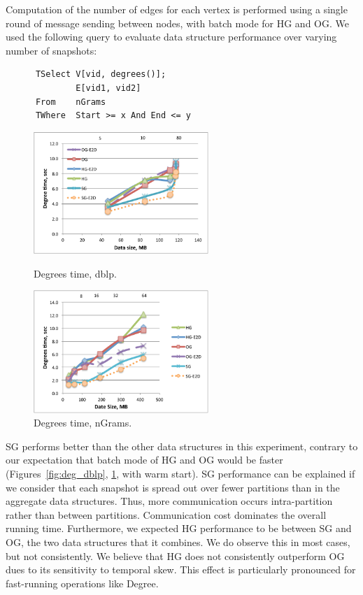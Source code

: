 Computation of the number of edges for each vertex is performed using
a single round of message sending between nodes, with batch mode for
HG and OG.  We used the following query to evaluate data structure
performance over varying number of snapshots:

\begin{small}
\begin{verbatim}
      TSelect V[vid, degrees()];
              E[vid1, vid2]
      From    nGrams
      TWhere  Start >= x And End <= y
\end{verbatim}
\end{small}

\begin{figure}[t]
\centering
\begin{minipage}{3in}
  \centering
  \includegraphics[width=2.6in]{figs/degrees_dblp.pdf}
  \vspace{-0.1in}
  \caption{Degrees time, dblp.}
  \label{fig:deg_dblp}
  \vspace{-0.1in}
\end{minipage}
\begin{minipage}{3in}
  \centering
\includegraphics[width=2.6in]{figs/degrees_ngrams.pdf}
  \vspace{-0.1in}
\caption{Degrees time, nGrams.}
\label{fig:deg_ngrams}
  \vspace{-0.1in}
\end{minipage}
\end{figure}

SG performs better than the other data structures in this experiment,
contrary to our expectation that batch mode of HG and OG would be
faster (Figures~\ref{fig:deg_dblp}, \ref{fig:deg_ngrams}, with warm
start).  SG performance can be explained if we consider that each
snapshot is spread out over fewer partitions than in the aggregate
data structures.  Thus, more communication occurs intra-partition
rather than between partitions.  Communication cost dominates the
overall running time.  Furthermore, we expected HG performance to be
between SG and OG, the two data structures that it combines.  We do
observe this in most cases, but not consistently.  We believe that HG
does not consistently outperform OG dues to its sensitivity to
temporal skew.  This effect is particularly pronounced for
fast-running operations like Degree.

